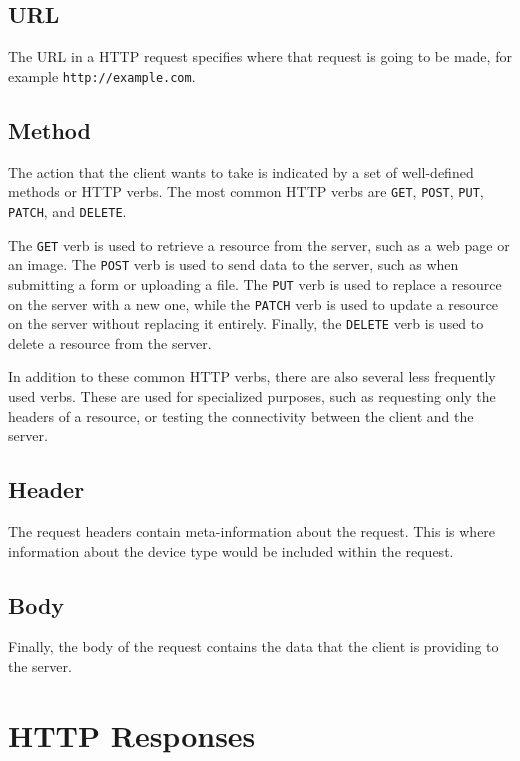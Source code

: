 \documentclass[
  12pt,
]{book}
\begin{document}
\hypertarget{url}{%
\subsection{URL}\label{url}}

The URL in a HTTP request specifies where that request is going to be made, for example \texttt{http://example.com}.

\hypertarget{method}{%
\subsection{Method}\label{method}}

The action that the client wants to take is indicated by a set of well-defined methods or HTTP verbs. The most common HTTP verbs are \texttt{GET}, \texttt{POST}, \texttt{PUT}, \texttt{PATCH}, and \texttt{DELETE}.

The \texttt{GET} verb is used to retrieve a resource from the server, such as a web page or an image. The \texttt{POST} verb is used to send data to the server, such as when submitting a form or uploading a file. The \texttt{PUT} verb is used to replace a resource on the server with a new one, while the \texttt{PATCH} verb is used to update a resource on the server without replacing it entirely. Finally, the \texttt{DELETE} verb is used to delete a resource from the server.

In addition to these common HTTP verbs, there are also several less frequently used verbs. These are used for specialized purposes, such as requesting only the headers of a resource, or testing the connectivity between the client and the server.

\hypertarget{header}{%
\subsection{Header}\label{header}}

The request headers contain meta-information about the request. This is where information about the device type would be included within the request.

\hypertarget{body}{%
\subsection{Body}\label{body}}

Finally, the body of the request contains the data that the client is providing to the server.

\hypertarget{http-responses}{%
\section{HTTP Responses}\label{http-responses}}
\end{document}
